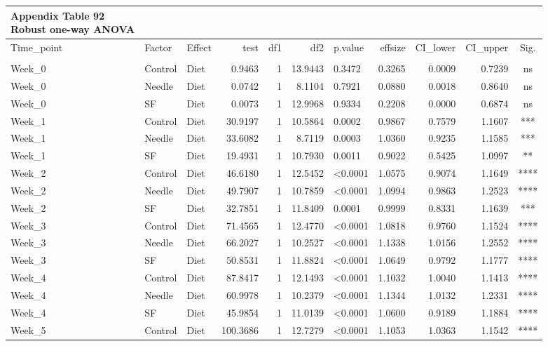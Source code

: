 \documentclass[
  12pt,
  letterpaper,
]{article}
\begin{document}
\begin{longtable}{lllrrrlrrrc}
\caption*{
{\large \textbf{Appendix Table 92}} \\ 
{\small \textbf{Robust one-way ANOVA}}
} \\ 
\toprule
Time\_point & Factor & Effect & test & df1 & df2 & p.value & effsize & CI\_lower & CI\_upper & Sig. \\ 
\midrule\addlinespace[2.5pt]
\multicolumn{11}{l}{Split by Route} \\ 
\midrule\addlinespace[2.5pt]
Week\_0 & Control & Diet & 0.9463 & 1 & 13.9443 & 0.3472 & 0.3265 & 0.0009 & 0.7239 & ns \\ 
Week\_0 & Needle & Diet & 0.0742 & 1 & 8.1104 & 0.7921 & 0.0880 & 0.0018 & 0.8640 & ns \\ 
Week\_0 & SF & Diet & 0.0073 & 1 & 12.9968 & 0.9334 & 0.2208 & 0.0000 & 0.6874 & ns \\ 
Week\_1 & Control & Diet & 30.9197 & 1 & 10.5864 & 0.0002 & 0.9867 & 0.7579 & 1.1607 & *** \\ 
Week\_1 & Needle & Diet & 33.6082 & 1 & 8.7119 & 0.0003 & 1.0360 & 0.9235 & 1.1585 & *** \\ 
Week\_1 & SF & Diet & 19.4931 & 1 & 10.7930 & 0.0011 & 0.9022 & 0.5425 & 1.0997 & ** \\ 
Week\_2 & Control & Diet & 46.6180 & 1 & 12.5452 & <0.0001 & 1.0575 & 0.9074 & 1.1649 & **** \\ 
Week\_2 & Needle & Diet & 49.7907 & 1 & 10.7859 & <0.0001 & 1.0994 & 0.9863 & 1.2523 & **** \\ 
Week\_2 & SF & Diet & 32.7851 & 1 & 11.8409 & 0.0001 & 0.9999 & 0.8331 & 1.1639 & *** \\ 
Week\_3 & Control & Diet & 71.4565 & 1 & 12.4770 & <0.0001 & 1.0818 & 0.9760 & 1.1524 & **** \\ 
Week\_3 & Needle & Diet & 66.2027 & 1 & 10.2527 & <0.0001 & 1.1338 & 1.0156 & 1.2552 & **** \\ 
Week\_3 & SF & Diet & 50.8531 & 1 & 11.8824 & <0.0001 & 1.0649 & 0.9792 & 1.1777 & **** \\ 
Week\_4 & Control & Diet & 87.8417 & 1 & 12.1493 & <0.0001 & 1.1032 & 1.0040 & 1.1413 & **** \\ 
Week\_4 & Needle & Diet & 60.9978 & 1 & 10.2379 & <0.0001 & 1.1344 & 1.0132 & 1.2331 & **** \\ 
Week\_4 & SF & Diet & 45.9854 & 1 & 11.0139 & <0.0001 & 1.0600 & 0.9189 & 1.1884 & **** \\ 
Week\_5 & Control & Diet & 100.3686 & 1 & 12.7279 & <0.0001 & 1.1053 & 1.0363 & 1.1542 & **** \\ 

\end{longtable}
\end{document}
